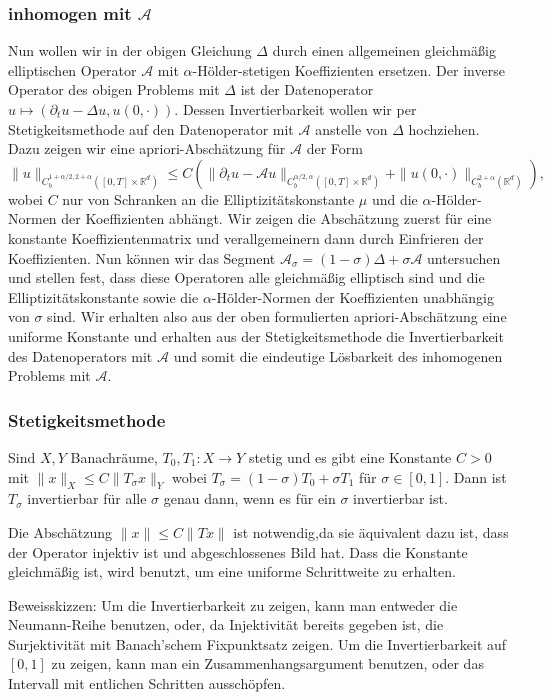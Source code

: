 \documentclass[11pt,a4paper]{scrartcl}
\newcommand{\R}{\mathbb{R}} %
\newcommand{\A}{\mathcal{A}}
\theoremstyle{plain}
\theoremstyle{definition}
\theoremstyle{remark}
\begin{document}
\subsubsection{inhomogen mit $\A$}

Nun wollen wir in der obigen Gleichung $\Delta$ durch einen allgemeinen gleichmäßig elliptischen Operator $\A$ mit $\alpha$-Hölder-stetigen Koeffizienten ersetzen. Der inverse Operator des obigen Problems mit $\Delta$ ist der Datenoperator $u\mapsto (\partial_t u - \Delta u, u(0,\cdot))$. Dessen Invertierbarkeit wollen wir per Stetigkeitsmethode auf den Datenoperator mit $\A$ anstelle von $\Delta$ hochziehen. Dazu zeigen wir eine apriori-Abschätzung für $\A$ der Form $$\|u\|_{C_b^{1+\alpha/2,2+\alpha}([0,T]\times \R^d)} \leq C \left( \|\partial_t u - \A u\|_{C_b^{\alpha/2,\alpha}([0,T]\times \R^d)} + \|u(0,\cdot)\|_{C_b^{2+\alpha}(\R^d)} \right),$$ wobei $C$ nur von Schranken an die Elliptizitätskonstante $\mu$ und die $\alpha$-Hölder-Normen der Koeffizienten abhängt. Wir zeigen die Abschätzung zuerst für eine konstante Koeffizientenmatrix und verallgemeinern dann durch Einfrieren der Koeffizienten. Nun können wir das Segment $\A_\sigma = (1-\sigma)\Delta + \sigma \A$ untersuchen und stellen fest, dass diese Operatoren alle gleichmäßig elliptisch sind und die Elliptizitätskonstante sowie die $\alpha$-Hölder-Normen der Koeffizienten unabhängig von $\sigma$ sind. Wir erhalten also aus der oben formulierten apriori-Abschätzung eine uniforme Konstante und erhalten aus der Stetigkeitsmethode die Invertierbarkeit des Datenoperators mit $\A$ und somit die eindeutige Lösbarkeit des inhomogenen Problems mit $\A$.

\subsubsection{Stetigkeitsmethode}

Sind $X,Y$ Banachräume, $T_0,T_1:X\to Y$ stetig und es gibt eine Konstante $C>0$ mit $\|x\|_X \leq C \|T_\sigma x\|_Y$ wobei $T_\sigma = (1-\sigma) T_0 + \sigma T_1$ für $\sigma\in [0,1]$. Dann ist $T_\sigma$ invertierbar für alle $\sigma$ genau dann, wenn es für ein $\sigma$ invertierbar ist.

Die Abschätzung $\|x\|\leq C\|Tx\|$ ist notwendig,da sie äquivalent dazu ist, dass der Operator injektiv ist und abgeschlossenes Bild hat. Dass die Konstante gleichmäßig ist, wird benutzt, um eine uniforme Schrittweite zu erhalten.

Beweisskizzen: Um die Invertierbarkeit zu zeigen, kann man entweder die Neumann-Reihe benutzen, oder, da Injektivität bereits gegeben ist, die Surjektivität mit Banach'schem Fixpunktsatz zeigen. Um die Invertierbarkeit auf $[0,1]$ zu zeigen, kann man ein Zusammenhangsargument benutzen, oder das Intervall mit entlichen Schritten ausschöpfen.
\end{document}
